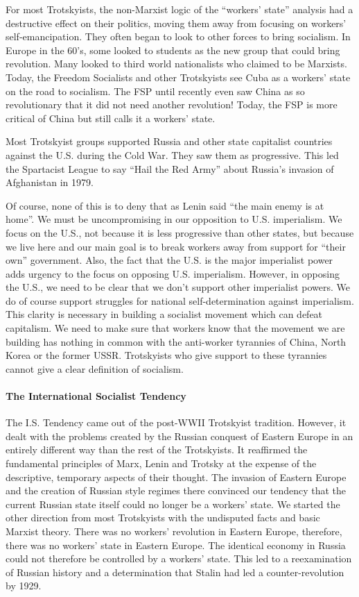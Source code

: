 For most Trotskyists, the non-Marxist logic of the ``workers' state'' analysis had a destructive effect on their politics, moving them away from focusing on workers' self-emancipation. They often began to look to other forces to bring socialism. In Europe in the 60's, some looked to students as the new group that could bring revolution. Many looked to third world nationalists who claimed to be Marxists. Today, the Freedom Socialists and other Trotskyists see Cuba as a workers' state on the road to socialism. The FSP until recently even saw China as so revolutionary that it did not need another revolution! Today, the FSP is more critical of China but still calls it a workers' state.

Most Trotskyist groups supported Russia and other state capitalist countries against the U.S. during the Cold War. They saw them as progressive. This led the Spartacist League to say ``Hail the Red Army'' about Russia's invasion of Afghanistan in 1979.

Of course, none of this is to deny that as Lenin said ``the main enemy is at home''. We must be uncompromising in our opposition to U.S. imperialism. We focus on the U.S., not because it is less progressive than other states, but because we live here and our main goal is to break workers away from support for ``their own'' government. Also, the fact that the U.S. is the major imperialist power adds urgency to the focus on opposing U.S. imperialism. However, in opposing the U.S., we need to be clear that we don't support other imperialist powers. We do of course support struggles for national self-determination against imperialism. This clarity is necessary in building a socialist movement which can defeat capitalism. We need to make sure that workers know that the movement we are building has nothing in common with the anti-worker tyrannies of China, North Korea or the former USSR. Trotskyists who give support to these tyrannies cannot give a clear definition of socialism.

\paragraph{The International Socialist Tendency}

The I.S. Tendency came out of the post-WWII Trotskyist tradition. However, it dealt with the problems created by the Russian conquest of Eastern Europe in an entirely different way than the rest of the Trotskyists. It reaffirmed the fundamental principles of Marx, Lenin and Trotsky at the expense of the descriptive, temporary aspects of their thought. The invasion of Eastern Europe and the creation of Russian style regimes there convinced our tendency that the current Russian state itself could no longer be a workers' state. We started the other direction from most Trotskyists with the undisputed facts and basic Marxist theory. There was no workers' revolution in Eastern Europe, therefore, there was no workers' state in Eastern Europe. The identical economy in Russia could not therefore be controlled by a workers' state. This led to a reexamination of Russian history and a determination that Stalin had led a counter-revolution by 1929.


